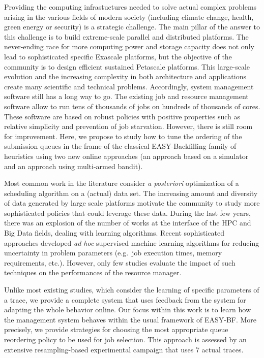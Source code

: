 \documentclass[sigconf,anonymous]{acmart}
\begin{document}
Providing the computing infrastuctures needed to solve actual complex problems
arising in the various fields of modern society (including climate change,
health, green energy or security) is a strategic challenge. The main pillar of
the answer to this challenge is to build extreme-scale parallel and distributed
platforms. The never-ending race for more computing power and storage capacity
does not only lead to sophisticated specific Exascale platforms, but the
objective of the community is to design efficient sustained Petascale
platforms. This large-scale evolution and the increasing complexity in both
architecture and applications create many scientific and technical problems.
Accordingly, system management software still has a long way to go. The
existing job and resource management software allow to run tens of thousands of
jobs on hundreds of thousands of cores. These software are based on robust
policies with positive properties such as relative simplicity and prevention of
job starvation. However, there is still room for improvement. Here, we propose
to study how to tune the ordering of the submission queues in the frame of the
classical EASY-Backfilling family of heuristics using two new online approaches
(an approach based on a simulator and an approach using multi-armed bandit).

Most common work in the literature consider \textit{a posteriori} optimization
of a scheduling algorithm on a (actual) data set.  The increasing amount and
diversity of data generated by large scale platforms motivate the community to
study more sophisticated policies that could leverage these data.  During the
last few years, there was an explosion of the number of works at the interface
of the HPC and Big Data fields, dealing with learning algorithms. Recent
sophisticated approaches developed \textit{ad hoc} supervised machine learning
algorithms for reducing uncertainty in problem parameters (e.g.\ job execution
times, memory requirements, etc.). However, only few studies
evaluate the impact of such techniques on the performances of the resource
manager.

Unlike most existing studies, which consider the learning of specific
parameters of a trace, we provide a complete system that uses feedback from the
system for adapting the whole behavior online.  Our focus within this work is
to learn how the management system behaves within the usual framework of
EASY-BF. More precisely, we provide strategies for choosing the most
appropriate queue reordering policy to be used for job selection. This approach
is assessed by an extensive resampling-based experimental campaign that uses 7
actual traces.
\end{document}
